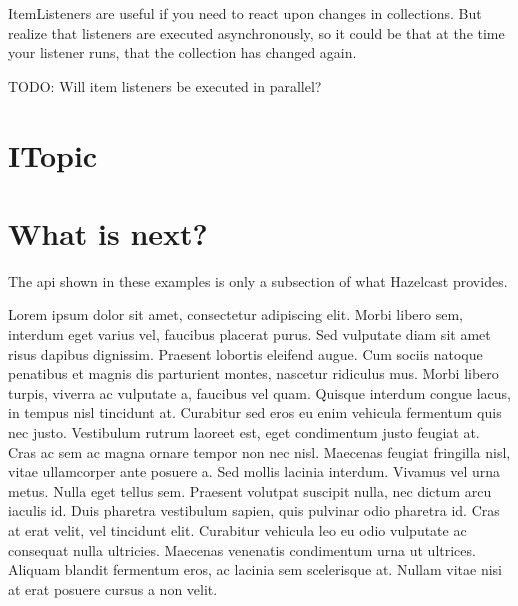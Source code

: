 ItemListeners are useful if you need to react upon changes in collections. But realize that listeners 
are executed asynchronously, so it could be that at the time your listener runs, that the collection 
has changed again.

TODO: Will item listeners be executed in parallel?

\section{ITopic}

\section{What is next?}
The api shown in these examples is only a subsection of what Hazelcast provides.

Lorem ipsum dolor sit amet, consectetur adipiscing elit. Morbi libero sem,
interdum eget varius vel, faucibus placerat purus. Sed vulputate diam sit amet
risus dapibus dignissim. Praesent lobortis eleifend augue. Cum sociis natoque
penatibus et magnis dis parturient montes, nascetur ridiculus mus. Morbi libero
turpis, viverra ac vulputate a, faucibus vel quam. Quisque interdum congue
lacus, in tempus nisl tincidunt at. Curabitur sed eros eu enim vehicula
fermentum quis nec justo. Vestibulum rutrum laoreet est, eget condimentum justo
feugiat at. Cras ac sem ac magna ornare tempor non nec nisl. Maecenas feugiat
fringilla nisl, vitae ullamcorper ante posuere a. Sed mollis lacinia interdum.
Vivamus vel urna metus. Nulla eget tellus sem. Praesent volutpat suscipit nulla,
nec dictum arcu iaculis id. Duis pharetra vestibulum sapien, quis pulvinar odio
pharetra id. Cras at erat velit, vel tincidunt elit. Curabitur vehicula leo eu
odio vulputate ac consequat nulla ultricies. Maecenas venenatis condimentum
urna ut ultrices. Aliquam blandit fermentum eros, ac lacinia sem scelerisque
at. Nullam vitae nisi at erat posuere cursus a non velit.
